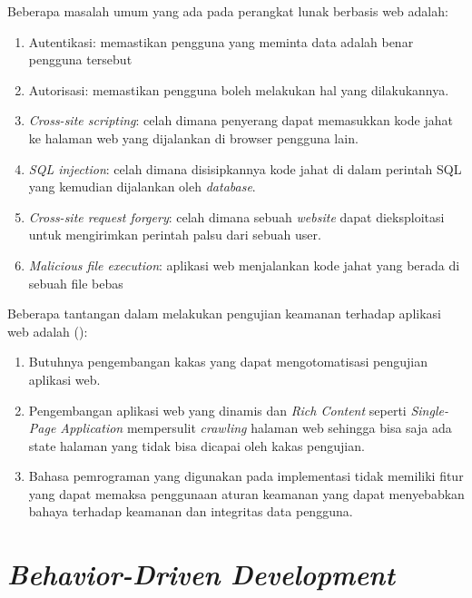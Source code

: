 Beberapa masalah umum yang ada pada perangkat lunak berbasis web adalah:
\begin{enumerate}
      \item Autentikasi: memastikan pengguna yang meminta data adalah benar pengguna tersebut
      \item Autorisasi: memastikan pengguna boleh melakukan hal yang dilakukannya.

      \item \emph{Cross-site scripting}:
            celah dimana penyerang dapat memasukkan kode jahat ke halaman web yang dijalankan di browser pengguna lain.

      \item \emph{SQL injection}:
            celah dimana disisipkannya kode jahat di dalam perintah SQL yang kemudian dijalankan oleh \emph{database}.

      \item \emph{Cross-site request forgery}:
            celah dimana sebuah \emph{website} dapat dieksploitasi untuk mengirimkan perintah palsu dari sebuah user.

      \item \emph{Malicious file execution}:
            aplikasi web menjalankan kode jahat yang berada di sebuah file bebas
\end{enumerate}

Beberapa tantangan dalam melakukan pengujian keamanan terhadap aplikasi web adalah (\cite{websecchal}):
\begin{enumerate}
      \item Butuhnya pengembangan kakas yang dapat mengotomatisasi pengujian aplikasi web.

      \item Pengembangan aplikasi web yang dinamis dan \emph{Rich Content} seperti \emph{Single-Page Application}
            mempersulit \emph{crawling} halaman web sehingga bisa saja ada state halaman yang
            tidak bisa dicapai oleh kakas pengujian.

      \item Bahasa pemrograman yang digunakan pada implementasi tidak memiliki fitur yang
            dapat memaksa penggunaan aturan keamanan yang dapat menyebabkan bahaya terhadap keamanan
            dan integritas data pengguna.
\end{enumerate}



\section{\emph{Behavior-Driven Development}}

